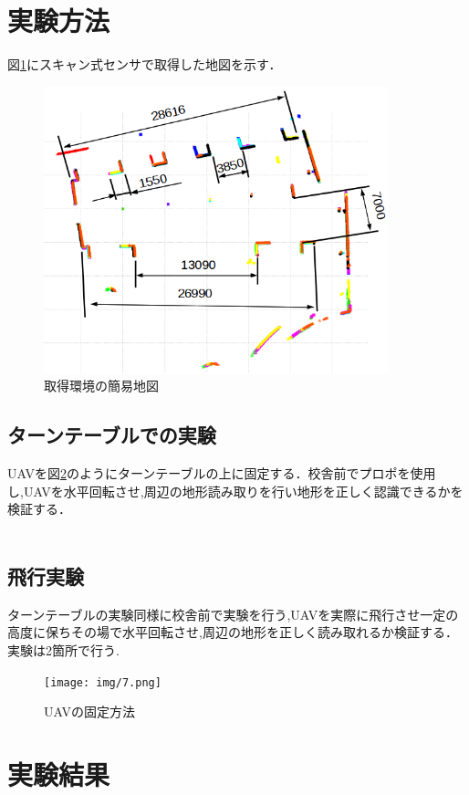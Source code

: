 \documentclass[12pt,oneside]{sotsuken_paper}
\begin{document}
\section{実験方法}図\ref{fig:8}にスキャン式センサで取得した地図を示す．\\

\begin{figure}[H]
\begin{center}
\includegraphics[width=100mm]{img/8.png}
\end{center}
\caption{取得環境の簡易地図}
\label{fig:8}
\end{figure}

\subsection{ターンテーブルでの実験}UAVを図\ref{fig:7}のようにターンテーブルの上に固定する．校舎前でプロポを使用し,UAVを水平回転させ,周辺の地形読み取りを行い地形を正しく認識できるかを検証する．\\
　
\subsection{飛行実験}ターンテーブルの実験同様に校舎前で実験を行う,UAVを実際に飛行させ一定の高度に保ちその場で水平回転させ,周辺の地形を正しく読み取れるか検証する．実験は2箇所で行う.

\begin{figure}[H]
\begin{center}
\texttt{[image: img/7.png]}
\end{center}
\caption{UAVの固定方法}
\label{fig:7}
\end{figure}



\section{実験結果}
\end{document}
